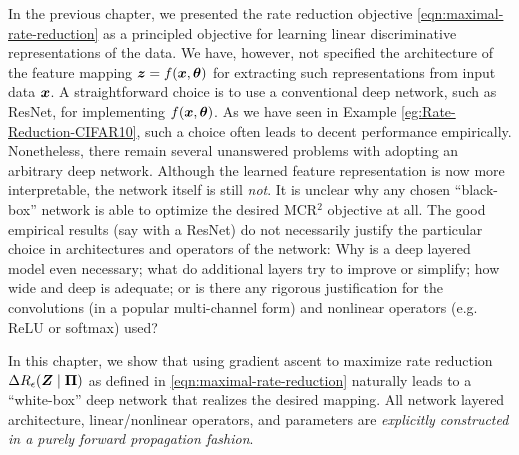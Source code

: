 \documentclass[../../book-main.tex]{subfiles}
\begin{document}
In the previous chapter, we presented the rate reduction objective \eqref{eqn:maximal-rate-reduction} as a principled objective for learning linear discriminative representations of the data. We have, however, not specified the architecture of the feature mapping $\bm{z} = f(\bm{x}, \bm \theta)$ for extracting such representations from input data $\bm{x}$. 
A straightforward choice is to use a conventional deep network, such as ResNet, for implementing $f(\bm{x}, \bm \theta)$. As we have seen in Example \ref{eg:Rate-Reduction-CIFAR10}, such a choice often leads to decent performance empirically. Nonetheless, there remain several unanswered problems with adopting an arbitrary deep network. Although the learned feature representation is now more interpretable, the network itself is still {\em not}. It is unclear why any chosen ``black-box'' network is able to optimize the desired MCR$^2$ objective at all. The good empirical results (say with a ResNet) do not necessarily justify the particular choice in architectures and operators of the network: Why is a deep layered model even necessary; what do additional layers try to improve or simplify; how wide and deep is adequate; or is there any rigorous justification for the convolutions (in a popular multi-channel form) and nonlinear operators (e.g. ReLU or softmax) used? 

In this chapter, we show that using gradient ascent to maximize rate reduction $\Delta R_{\epsilon}(\bm{Z} \mid \bm \Pi)$ as defined in \eqref{eqn:maximal-rate-reduction} naturally leads to a ``white-box'' deep network that realizes the desired mapping. All network layered architecture, linear/nonlinear operators, and parameters are {\em explicitly constructed in a purely forward propagation fashion}. 
\end{document}
